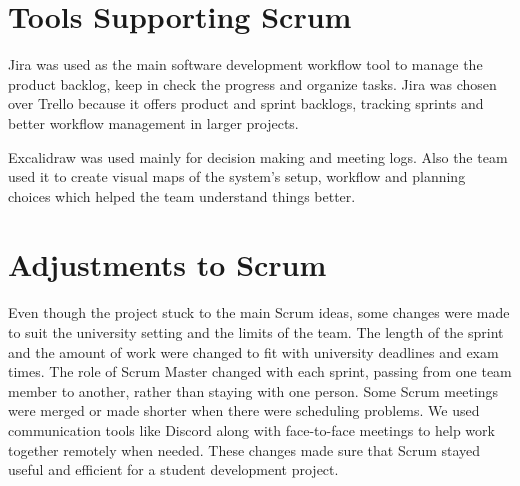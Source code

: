 \section{Tools Supporting Scrum}
Jira was used as the main software development workflow tool to manage the product backlog, keep in check the progress and organize tasks. Jira was chosen over Trello because it offers product and sprint backlogs, tracking sprints and better workflow management in larger projects.
\par
Excalidraw was used mainly for decision making and meeting logs. Also the team used it to create visual maps of the system’s setup, workflow and planning choices which helped the team understand things better.  
\section{Adjustments to Scrum}
Even though the project stuck to the main Scrum ideas, some changes were made to suit the university setting and the limits of the team. The length of the sprint and the amount of work were changed to fit with university deadlines and exam times. The role of Scrum Master changed with each sprint, passing from one team member to another, rather than staying with one person. Some Scrum meetings were merged or made shorter when there were scheduling problems. We used communication tools like Discord along with face-to-face meetings to help work together remotely when needed. These changes made sure that Scrum stayed useful and efficient for a student development project.